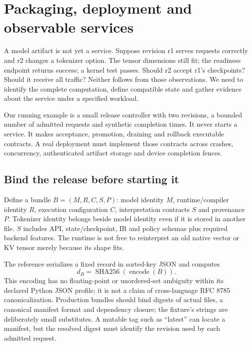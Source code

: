 \chapter{Packaging, deployment and observable services}
\label{evod44:chapter}

A model artifact is not yet a service. Suppose revision r1 serves requests
correctly and r2 changes a tokenizer option. The tensor dimensions still fit;
the readiness endpoint returns success; a kernel test passes. Should r2 accept
r1's checkpoints? Should it receive all traffic? Neither follows from those
observations. We need to identify the complete computation, define compatible
state and gather evidence about the service under a specified workload.

Our running example is a small release controller with two revisions, a bounded
number of admitted requests and synthetic completion times. It never starts a
service. It makes acceptance, promotion, draining and rollback executable
contracts. A real deployment must implement those contracts across crashes,
concurrency, authenticated artifact storage and device completion fences.

\section{Bind the release before starting it}
\label{evod44:bundle}
Define a bundle $B=(M,R,C,S,P)$: model identity $M$, runtime/compiler
identity $R$, execution configuration $C$, interpretation contracts $S$ and
provenance $P$. Tokenizer identity belongs beside model identity even if it
is stored in another file. $S$ includes API, state/checkpoint, IR and policy
schemas plus required backend features. The runtime is not free to reinterpret
an old native vector or KV tensor merely because its shape fits.

The reference serializes a fixed record in sorted-key JSON and computes
\[
d_B=\operatorname{SHA256}(\operatorname{encode}(B)).
\]
This encoding has no
floating-point or unordered-set ambiguity within its declared Python JSON
profile; it is not a claim of cross-language RFC 8785 canonicalization.
Production bundles should bind
digests of actual files, a canonical manifest format and dependency closure;
the fixture's strings are deliberately small substitutes. A mutable tag such
as ``latest'' can locate a manifest, but the resolved digest must identify
the revision used by each admitted request.

